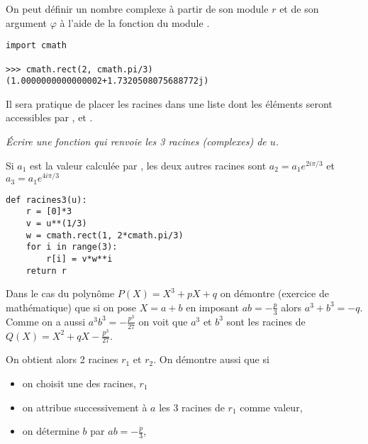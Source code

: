 On peut définir un nombre complexe à partir de son module $r$ et de son argument $\varphi$ à l'aide de la fonction  du module .
\begin{lstlisting}
import cmath 

>>> cmath.rect(2, cmath.pi/3)
(1.0000000000000002+1.7320508075688772j)
\end{lstlisting}

Il sera pratique de placer les racines dans une liste  dont les éléments seront accessibles par ,  et  . 

\begin{Exercise}
\it Écrire une fonction  qui renvoie les 3 racines (complexes) de $u$.

Si $a_1$ est la valeur calculée par , les deux autres racines sont $a_2=a_1e^{2i\pi/3}$ et $a_3=a_1e^{4i\pi/3}$ 
\end{Exercise}
\begin{Answer}
\begin{lstlisting}
def racines3(u):
    r = [0]*3
    v = u**(1/3)
    w = cmath.rect(1, 2*cmath.pi/3)
    for i in range(3):
        r[i] = v*w**i
    return r
\end{lstlisting}
\end{Answer}
\medskip

Dans le cas du polynôme $P(X)=X^3+pX+q$ on démontre (exercice de mathématique) que si on pose $X = a+b$ en imposant $ab = -\frac p3$ alors $a^3+b^3 = -q$. Comme on a aussi $a^3b^3 = -\frac {p^3}{27}$ on voit que $a^3$ et $b^3$ sont les racines de $\displaystyle Q(X) = X^2 +qX-\frac {p^3}{27}$.

On obtient alors 2 racines $r_1$ et $r_2$. On démontre aussi que si

\begin{itemize}
    \item on choisit une des racines, $r_1$
    \item on attribue successivement à $a$ les 3 racines de $r_1$ comme valeur,
    \item on détermine $b$ par $ab = -\frac p3$,
\end{itemize} 

